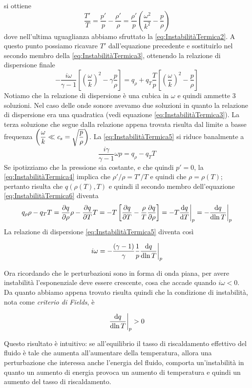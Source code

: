 si ottiene
\begin{equation}
\dfrac{T'}{T} = \dfrac{p'}{p} - \dfrac{\rho'}{\rho} = \dfrac{\rho'}{p}\left( \dfrac{\omega^2}{k^2}-\dfrac{p}{\rho}\right) \label{eq:InstabilitàTermica4}
\end{equation}
dove nell'ultima uguaglianza abbiamo sfruttato la \ref{eq:InstabilitàTermica2}.
A questo punto possiamo ricavare $T'$ dall'equazione precedente e sostituirlo nel secondo membro della \ref{eq:InstabilitàTermica3}, ottenendo la relazione di dispersione finale
\begin{equation}
-\dfrac{i\omega}{\gamma-1}\left[ \left( \dfrac{\omega}{k} \right)^2-\gamma \dfrac{p}{\rho} \right] = q_\rho + q_T \dfrac{T}{p}\left[\left(\dfrac{\omega}{k}\right)^2 - \dfrac{p}{\rho}\right] \label{eq:InstabilitàTermica5}
\end{equation}
Notiamo che la relazione di dispersione è una cubica in $\omega$ e quindi ammette 3 soluzioni. Nel caso delle onde sonore avevamo due soluzioni in quanto la relazione di dispersione era una quadratica (vedi equazione \ref{eq:InstabilitàTermica3}). La terza soluzione che segue dalla relazione appena trovata risulta dal limite a basse frequenza $\left(\dfrac{\omega}{k} \ll \textit{c}_{s} = \sqrt{\dfrac{p}{\rho}}\right)$. La \ref{eq:InstabilitàTermica5} si riduce banalmente a
\begin{equation}
\dfrac{i\gamma}{\gamma-1} \omega p = q_\rho - q_T T \label{eq:InstabilitàTermica6}
\end{equation}
Se ipotizziamo che la pressione sia costante, e che quindi $p'=0$, la \ref{eq:InstabilitàTermica4} implica che $\rho'/\rho=T'/T$ e quindi che $\rho=\rho(T)$; pertanto risulta che $q(\rho(T), T)$ e quindi il secondo membro dell'equazione \ref{eq:InstabilitàTermica6} diventa
\begin{align*}
q_\rho \rho- q_T T = \dfrac{\partial {q}}{\partial {\rho}}\rho - \dfrac{\partial {q}}{\partial {T}}T = -T \left[\dfrac{\partial {q}}{\partial {T}}-\dfrac{\rho}{T}\dfrac{\partial {q}}{\partial {\rho}}\right] = -T \dfrac{\mathrm{d} {q}}{\mathrm{d} {T}}\bigg|_p = -\dfrac{\mathrm{d} {q}}{\mathrm{d} {\ln T}}\bigg|_p 
\end{align*}
La relazione di dispersione \ref{eq:InstabilitàTermica5} diventa così
\begin{EQ}
\begin{equation}
i\omega = - \dfrac{(\gamma - 1)}{\gamma} \dfrac{1}{p} \dfrac{\mathrm{d} {q}}{\mathrm{d} {\ln T}}\bigg|_p
\end{equation}
\end{EQ}
Ora ricordando che le perturbazioni sono in forma di onda piana, per avere instabilità l'esponenziale deve essere crescente, cosa che accade quando $i\omega<0$. Da quanto abbiamo appena trovato risulta quindi che la condizione di instabilità, nota come \textit{criterio di Fields}, è
\begin{EQ}
\begin{equation}
\dfrac{\mathrm{d} {q}}{\mathrm{d} {\ln T}}\bigg|_p >0
\end{equation}
\end{EQ}
Questo risultato è intuitivo: se all'equilibrio il tasso di riscaldamento effettivo del fluido è tale che aumenta all'aumentare della temperatura, allora una perturbazione che interessa anche l'energia del fluido, comporta un'instabilità in quanto un aumento di energia provoca un aumento di temperatura e quindi un aumento del tasso di riscaldamento.

